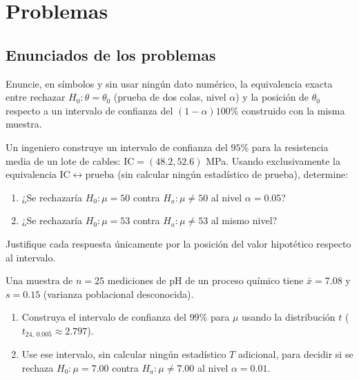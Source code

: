 \section*{Problemas}

\subsection*{Enunciados de los problemas}

\begin{problema}
	\label{prob:43cddbb}
	Enuncie, en símbolos y sin usar ningún dato numérico, la equivalencia exacta entre rechazar $H_0: \theta = \theta_0$ (prueba de dos colas, nivel $\alpha$) y la posición de $\theta_0$ respecto a un intervalo de confianza del $(1-\alpha)100\%$ construido con la misma muestra.
\end{problema}

\begin{problema}
	\label{prob:ae1a813}
	Un ingeniero construye un intervalo de confianza del $95\%$ para la resistencia media de un lote de cables: $\text{IC} = (48.2, 52.6)$ MPa. Usando exclusivamente la equivalencia IC$\leftrightarrow$prueba (sin calcular ningún estadístico de prueba), determine:
	\begin{enumerate}
		\item ¿Se rechazaría $H_0: \mu = 50$ contra $H_a: \mu \neq 50$ al nivel $\alpha = 0.05$?
		\item ¿Se rechazaría $H_0: \mu = 53$ contra $H_a: \mu \neq 53$ al mismo nivel?
	\end{enumerate}
	Justifique cada respuesta únicamente por la posición del valor hipotético respecto al intervalo.
\end{problema}

\begin{problema}
	\label{prob:1b375b0}
	Una muestra de $n = 25$ mediciones de pH de un proceso químico tiene $\bar{x} = 7.08$ y $s = 0.15$ (varianza poblacional desconocida).
	\begin{enumerate}
		\item Construya el intervalo de confianza del $99\%$ para $\mu$ usando la distribución $t$ ($t_{24,\,0.005} \approx 2.797$).
		\item Use ese intervalo, sin calcular ningún estadístico $T$ adicional, para decidir si se rechaza $H_0: \mu = 7.00$ contra $H_a: \mu \neq 7.00$ al nivel $\alpha = 0.01$.
	\end{enumerate}
\end{problema}

